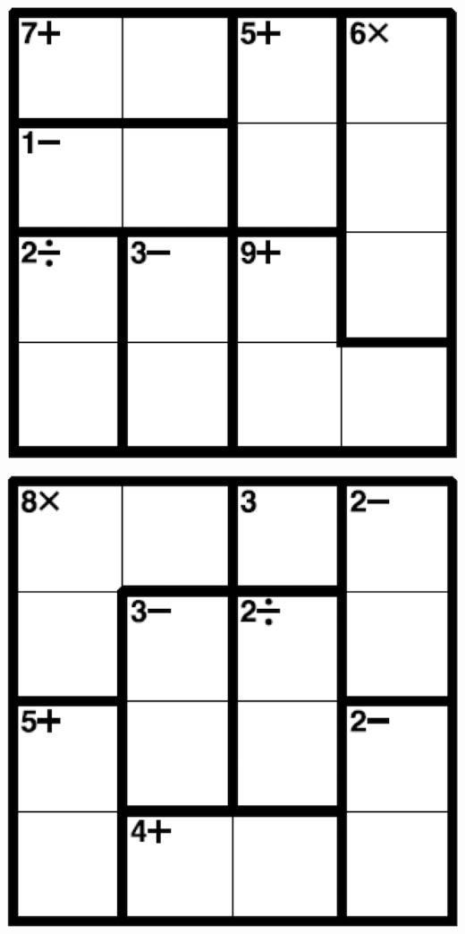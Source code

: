 
\includegraphics[scale=1]{Gambar/Lampiran/4x4_17.png}

\includegraphics[scale=1]{Gambar/Lampiran/4x4_18.png}
